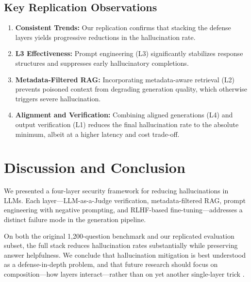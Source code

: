 \documentclass[11pt,a4paper]{article}
\begin{document}
\subsection{Key Replication Observations}
\begin{enumerate}
    \item \textbf{Consistent Trends:} Our replication confirms that stacking the defense layers yields progressive reductions in the hallucination rate.
    \item \textbf{L3 Effectiveness:} Prompt engineering (L3) significantly stabilizes response structures and suppresses early hallucinatory completions.
    \item \textbf{Metadata-Filtered RAG:} Incorporating metadata-aware retrieval (L2) prevents poisoned context from degrading generation quality, which otherwise triggers severe hallucination.
    \item \textbf{Alignment and Verification:} Combining aligned generations (L4) and output verification (L1) reduces the final hallucination rate to the absolute minimum, albeit at a higher latency and cost trade-off.
\end{enumerate}

\section{Discussion and Conclusion}
We presented a four-layer security framework for reducing hallucinations in LLMs. Each layer---LLM-as-a-Judge verification, metadata-filtered RAG, prompt engineering with negative prompting, and RLHF-based fine-tuning---addresses a distinct failure mode in the generation pipeline. 

On both the original 1,200-question benchmark and our replicated evaluation subset, the full stack reduces hallucination rates substantially while preserving answer helpfulness. We conclude that hallucination mitigation is best understood as a defense-in-depth problem, and that future research should focus on composition---how layers interact---rather than on yet another single-layer trick \cite{20,21}.
\end{document}
